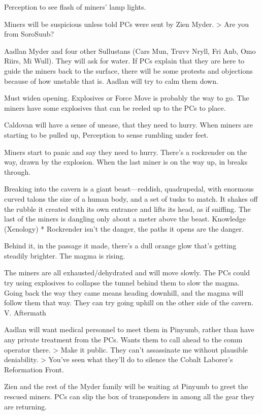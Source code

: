 \documentclass{book}
\begin{document}
Perception to see flash of miners’ lamp lights. 

Miners will be suspicious unless told PCs were sent by Zien Myder.
> Are you from SoroSuub?


Aadlan Myder and four other Sullustans (Cars Mun, Truvv Nryll, Fri Anb, Omo Riirs, Mi Wull). They will ask for water. If PCs explain that they are here to guide the miners back to the surface, there will be some protests and objections because of how unstable that is. Aadlan will try to calm them down.


Must widen opening. Explosives or Force Move is probably the way to go. The miners have some explosives that can be reeled up to the PCs to place.


Caldovan will have a sense of unease, that they need to hurry. When miners are starting to be pulled up, Perception to sense rumbling under feet.

Miners start to panic and say they need to hurry. There’s a rockrender on the way, drawn by the explosion. When the last miner is on the way up, in breaks through.

Breaking into the cavern is a giant beast—reddish, quadrupedal, with enormous curved talons the size of a human body, and a set of tusks to match. It shakes off the rubble it created with its own entrance and lifts its head, as if sniffing. The last of the miners is dangling only about a meter above the beast. 
Knowledge (Xenology)
* Rockrender isn’t the danger, the paths it opens are the danger.

Behind it, in the passage it made, there’s a dull orange glow that’s getting steadily brighter. The magma is rising.

The miners are all exhausted/dehydrated and will move slowly. The PCs could try using explosives to collapse the tunnel behind them to slow the magma. Going back the way they came means heading downhill, and the magma will follow them that way. They can try going uphill on the other side of the cavern.
V. Aftermath

Aadlan will want medical personnel to meet them in Pinyumb, rather than have any private treatment from the PCs. Wants them to call ahead to the comm operator there.
> Make it public. They can’t assassinate me without plausible deniability.
> You’ve seen what they’ll do to silence the Cobalt Laborer’s Reformation Front.

Zien and the rest of the Myder family will be waiting at Pinyumb to greet the rescued miners. PCs can slip the box of transponders in among all the gear they are returning.
\end{document}
